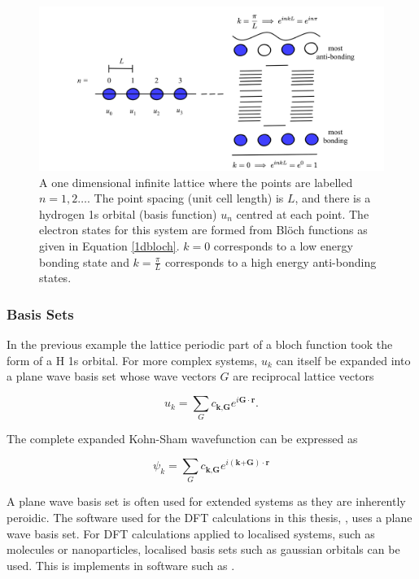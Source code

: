 \begin{figure}[h]
\centering
  \includegraphics[width=1.0\columnwidth]{figures/ch3/bands.png}
  \caption[Bonding and anti-bonding states in an infinite 1D crystal]{A one dimensional infinite lattice where the points are labelled $n=1,2\ldots$. The point spacing (unit cell length) is $L$, and there is a hydrogen 1s orbital (basis function) $u_n$ centred at each point. The electron states for this system are formed from Bl\"{o}ch functions as given in Equation \ref{1dbloch}. $k=0$ corresponds to a low energy bonding state and $k=\frac{\pi}{L}$ corresponds to a high energy anti-bonding states.} 
  \label{bands}
\end{figure}

\subsubsection{Basis Sets}   %

In the previous example the lattice periodic part of a bloch function took the form of a H 1s orbital. For more complex systems, $u_k$ can itself be expanded into a plane wave basis set whose wave vectors $G$ are reciprocal lattice vectors

\begin{equation}
u_k = \sum_Gc_{\textbf{k},\textbf{G}}e^{i\textbf{G}\cdot\textbf{r}}.
\end{equation}

The complete expanded Kohn-Sham wavefunction can be expressed as

\begin{equation} \label{KSeigenstates}
\psi_k = \sum_Gc_{\textbf{k},\textbf{G}}e^{i(\textbf{k+G})\cdot\textbf{r}}
\end{equation}

A plane wave basis set is often used for extended systems as they are inherently peroidic. The software used for the DFT calculations in this thesis, \autocite{}, uses a plane wave basis set. For DFT calculations applied to localised systems, such as molecules or nanoparticles, localised basis sets such as gaussian orbitals can be used. This is implements in software such as \autocite{}.

